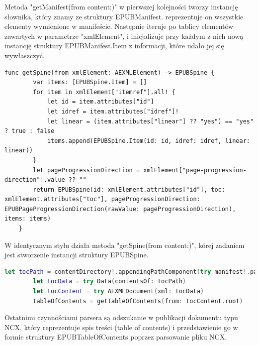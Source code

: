 Metoda "getManifest(from content:)" w pierwszej kolejności tworzy instancję słownika, który znamy ze struktury EPUBManifest. reprezentuje on wszystkie elementy wymienione w manifeście. Następnie iteruje po tablicy elementów zawartych w parametrze "xmlElement", i inicjalizuje przy każdym z nich nową instancję struktury EPUBManifest.Item z informacji, które udało jej się wywłaszczyć.

\begin{lstlisting}[caption={Implementacja metody getSpine(from xmlElement:).},language=swift-reference]
    func getSpine(from xmlElement: AEXMLElement) -> EPUBSpine {
        var items: [EPUBSpine.Item] = []
        for item in xmlElement["itemref"].all! {
            let id = item.attributes["id"]
            let idref = item.attributes["idref"]!
            let linear = (item.attributes["linear"] ?? "yes") == "yes" ? true : false
            items.append(EPUBSpine.Item(id: id, idref: idref, linear: linear))
        }
        let pageProgressionDirection = xmlElement["page-progression-direction"].value ?? ""
        return EPUBSpine(id: xmlElement.attributes["id"], toc: xmlElement.attributes["toc"], pageProgressionDirection: EPUBPageProgressionDirection(rawValue: pageProgressionDirection), items: items)
    }
\end{lstlisting}

W identycznym stylu działa metoda "getSpine(from content:)", kórej zadaniem jest stworzenie instancji struktury EPUBSpine.

\begin{lstlisting}[firstnumber=19, language=swift]
        let tocPath = contentDirectory!.appendingPathComponent(try manifest!.path(forItemWithId: spine?.toc ?? ""))
        let tocData = try Data(contentsOf: tocPath)
        let tocContent = try AEXMLDocument(xml: tocData)
        tableOfContents = getTableOfContents(from: tocContent.root)
\end{lstlisting}

Ostatnimi czynnościami parsera są odszukanie w publikacji dokumentu typu NCX, który reprezentuje spis treści (table of contents) i przedstawienie go w formie struktury EPUBTableOfContents poprzez parsowanie pliku NCX.


